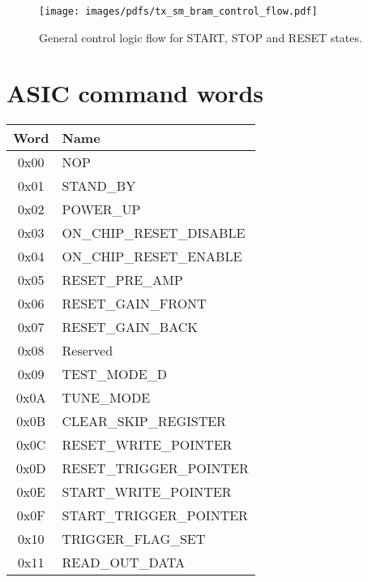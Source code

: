 \documentclass[]{report}
\begin{document}
    \begin{figure}[htbp]
        \centering
            \texttt{[image: images/pdfs/tx\_sm\_bram\_control\_flow.pdf]}
        \caption{General control logic flow for START, STOP and RESET states.}
        \label{fig:tx_sm_bram_control_flow}
    \end{figure}
    \appendix
    \chapter{ASIC command words} %
    \label{sec:asic_command_words}
    
    \begin{table}
        \begin{center}
            \setlength{\extrarowheight}{1.5pt}
            \begin{tabular}{c | l}
                Word & Name \\
                \hline  
                0x00 & NOP \\
                0x01 & STAND\_BY \\
                0x02 & POWER\_UP \\
                0x03 & ON\_CHIP\_RESET\_DISABLE \\
                0x04 & ON\_CHIP\_RESET\_ENABLE \\
                0x05 & RESET\_PRE\_AMP \\
                0x06 & RESET\_GAIN\_FRONT \\
                0x07 & RESET\_GAIN\_BACK \\
                0x08 & Reserved \\
                0x09 & TEST\_MODE\_D \\
                0x0A & TUNE\_MODE \\
                0x0B & CLEAR\_SKIP\_REGISTER \\
                0x0C & RESET\_WRITE\_POINTER \\
                0x0D & RESET\_TRIGGER\_POINTER \\
                0x0E & START\_WRITE\_POINTER \\
                0x0F & START\_TRIGGER\_POINTER \\
                0x10 & TRIGGER\_FLAG\_SET \\
                0x11 & READ\_OUT\_DATA \\

\end{tabular}
\end{center}
\end{table}
\end{document}
